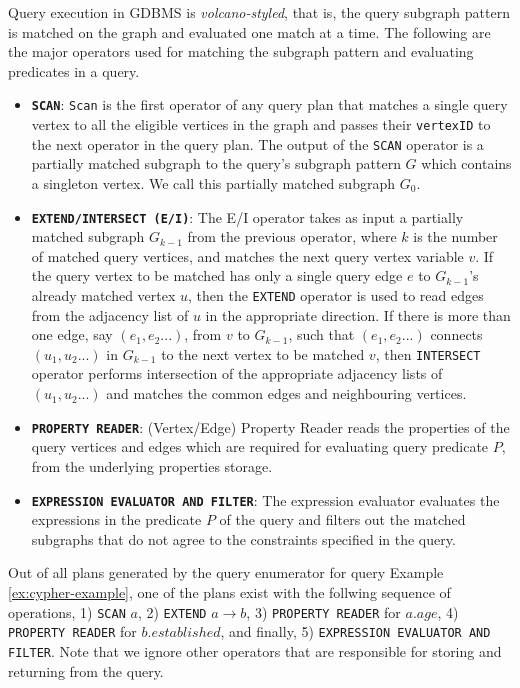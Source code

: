 Query execution in GDBMS is \emph{volcano-styled}, that is, the query subgraph pattern is matched on the graph and evaluated one match at a time. The following are the major operators used for matching the subgraph pattern and evaluating predicates in a query.
\begin{itemize}
	
	\item \textbf{\texttt{SCAN}}: \texttt{Scan} is the first operator of any query plan that matches a single query vertex to all the eligible vertices in the graph and passes their \texttt{vertexID} to the next operator in the query plan. The output of the \texttt{SCAN} operator is a partially matched subgraph to the query's subgraph pattern $G$ which contains a singleton vertex. We call this partially matched subgraph $G_0$.
	
	\item \textbf{\texttt{EXTEND/INTERSECT (E/I)}}: The E/I operator takes as input a partially matched subgraph $G_{k-1}$ from the previous operator, where $k$ is the number of matched query vertices, and matches the next query vertex variable $v$. If the query vertex to be matched has only a single query edge $e$ to $G_{k-1}$'s already matched vertex $u$, then the \texttt{EXTEND} operator is used to read edges from the adjacency list of $u$ in the appropriate direction. If there is more than one edge, say $(e_1, e_2 ...)$, from $v$ to $G_{k-1}$, such that $(e_1, e_2 ...)$ connects $(u_1, u_2 ...)$ in $G_{k-1}$ to the next vertex to be matched $v$, then \texttt{INTERSECT} operator performs intersection of the appropriate adjacency lists of $(u_1, u_2 ...)$ and matches the common edges and neighbouring vertices.  
	
	\item \textbf{\texttt{PROPERTY READER}}: (Vertex/Edge) Property Reader reads the properties of the query vertices and edges which are required for evaluating query predicate $P$, from the underlying properties storage. 
	
	\item \textbf{\texttt{EXPRESSION EVALUATOR AND FILTER}}: The expression evaluator evaluates the expressions in the predicate $P$ of the query and filters out the matched subgraphs that do not agree to the constraints specified in the query.
	
\end{itemize}

Out of all plans generated by the query enumerator for query Example \ref{ex:cypher-example}, one of the plans exist with the follwing sequence of operations, 1) \texttt{SCAN} $a$, 2) \texttt{EXTEND} $a{\rightarrow}b$, 3) \texttt{PROPERTY READER} for $a.age$, 4) \texttt{PROPERTY READER} for $b.established$, and finally, 5) \texttt{EXPRESSION EVALUATOR AND FILTER}. Note that we ignore other operators that are responsible for storing and returning from the query.

